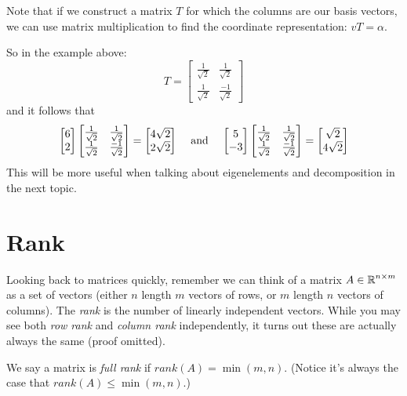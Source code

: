 \begin{aside}
Note that if we construct a matrix $T$ for which the columns are our basis vectors, 
we can use matrix multiplication to find the coordinate representation: $vT=\alpha$.
\vspace{2em}

So in the example above: 
\[T=\begin{bmatrix}\frac{1}{\sqrt{2}} & \frac{1}{\sqrt{2}} \\\frac{1}{\sqrt{2}} & \frac{-1}{\sqrt{2}}\end{bmatrix}\]
and it follows that 
\[
\begin{bmatrix}6\\2\end{bmatrix}\begin{bmatrix}\frac{1}{\sqrt{2}} & \frac{1}{\sqrt{2}} \\\frac{1}{\sqrt{2}} & \frac{-1}{\sqrt{2}}\end{bmatrix} = \begin{bmatrix}4\sqrt{2}\\2\sqrt{2}\end{bmatrix}
\;\;\;\textnormal{ and }\;\;\;
\begin{bmatrix}5\\-3\end{bmatrix}\begin{bmatrix}\frac{1}{\sqrt{2}} & \frac{1}{\sqrt{2}} \\\frac{1}{\sqrt{2}} & \frac{-1}{\sqrt{2}}\end{bmatrix} = \begin{bmatrix}\sqrt{2}\\4\sqrt{2}\end{bmatrix}
\]
This will be more useful when talking about eigenelements and decomposition in the next topic. 
\end{aside}

\section{Rank}
Looking back to matrices quickly,
remember we can think of a matrix $A\in\operatorname{\mathbb{R}}^{n\times m}$ as a set of vectors (either $n$ length $m$ vectors of rows, or $m$ length $n$ vectors of columns). 
The \emph{rank} is the number of linearly independent vectors. 
While you may see both \textit{row rank} and \textit{column rank} independently, 
it turns out these are actually always the same (proof omitted). 

We say a matrix is \emph{full rank} if $rank(A)=\min(m,n)$. (Notice it's always the case that $rank(A)\le\min(m,n)$.)

